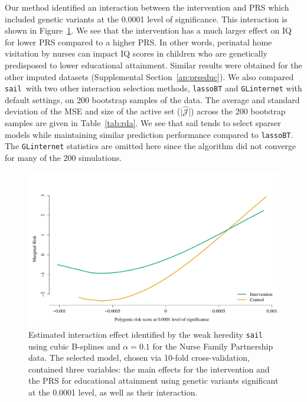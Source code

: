 \documentclass[a4paper,fleqn]{cas-sc}
\newcommand{\sail}{\texttt{sail}}
\begin{document}
Our method identified an interaction between the intervention and PRS which included genetic variants at the 0.0001 level of significance. 
This interaction is shown in Figure~\ref{fig:PRS-intervention-interaction}. 
We see that the intervention has a much larger effect on IQ for lower PRS compared to a higher PRS. 
In other words, perinatal home visitation by nurses can impact IQ scores in children who are genetically predisposed to lower educational attainment. Similar results were obtained for the other imputed datasets (Supplemental Section~\ref{ap:prseduc}). 
We also compared \sail ~with two other interaction selection methods, \texttt{lassoBT} and \texttt{GLinternet} with default settings, on 200 bootstrap samples of the data. The average and standard deviation of the MSE and size of the active set ($|\widehat{\mathcal{J}}$|) across the 200 bootstrap samples are given in Table~\ref{tab:rda}. We see that sail tends to select sparser models while maintaining similar prediction performance compared to \texttt{lassoBT}. The \texttt{GLinternet} statistics are omitted here since the algorithm did not converge for many of the 200 simulations.





%
%
%

\begin{figure}
	
	{\centering \includegraphics[width=1\linewidth]{figure/PRS-intervention-interaction-1} 
		
	}
	
	\caption[Estimated interaction effect identified by the weak heredity \texttt{sail} using cubic B-splines and $\alpha=0.1$ for the Nurse Family Partnership data]{Estimated interaction effect identified by the weak heredity \texttt{sail} using cubic B-splines and $\alpha=0.1$ for the Nurse Family Partnership data. The selected model, chosen via 10-fold cross-validation, contained three variables: the main effects for the intervention and the PRS for educational attainment using genetic variants significant at the 0.0001 level, as well as their interaction.}\label{fig:PRS-intervention-interaction}
\end{figure}
\end{document}
